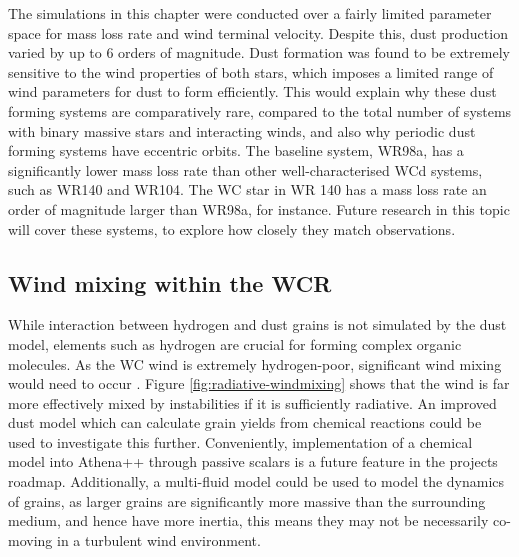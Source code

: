 \documentclass[fleqn,usenatbib]{mnras}
\begin{document}
The simulations in this chapter were conducted over a fairly limited parameter space for mass loss rate and wind terminal velocity.
Despite this, dust production varied by up to 6 orders of magnitude.
Dust formation was found to be extremely sensitive to the wind properties of both stars, which imposes a limited range of wind parameters for dust to form efficiently.
This would explain why these dust forming systems are comparatively rare, compared to the total number of systems with binary massive stars and interacting winds, and also why periodic dust forming systems have eccentric orbits.
The baseline system, WR98a, has a significantly lower mass loss rate than other well-characterised WCd systems, such as WR140 and WR104.
The WC star in WR 140 has a mass loss rate an order of magnitude larger than WR98a, for instance.
Future research in this topic will cover these systems,
to explore how closely they match observations.

\subsection{Wind mixing within the WCR}

While interaction between hydrogen and dust grains is not simulated by the dust model, elements such as hydrogen are crucial for forming complex organic molecules.
As the WC wind is extremely hydrogen-poor, significant wind mixing would need to occur
\citep{herbstComplexOrganicInterstellar2009}.
Figure \ref{fig:radiative-windmixing} shows that the wind is far more effectively mixed by instabilities if it is sufficiently radiative.
An improved dust model which can calculate grain yields from chemical reactions could be used to investigate this further.
Conveniently, implementation of a chemical model into Athena++ through passive scalars is a future feature in the projects roadmap.
Additionally, a multi-fluid model could be used to model the dynamics of grains, as larger grains are significantly more massive than the surrounding medium, and hence have more inertia, this means they may not be necessarily co-moving in a turbulent wind environment.
\end{document}
